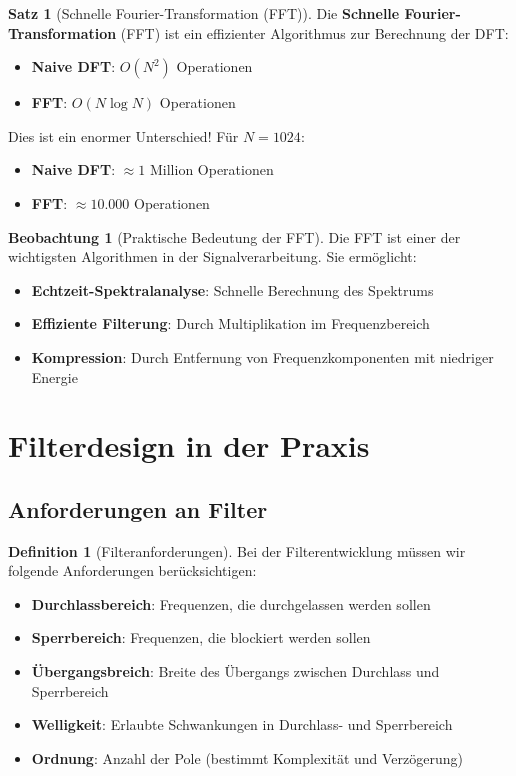 ﻿\documentclass[a4paper,12pt]{report}
\theoremstyle{definition}
\newtheorem{definition}{Definition}
\newtheorem{satz}{Satz}
\newtheorem{beobachtung}{Beobachtung}
\begin{document}
	\begin{satz}[Schnelle Fourier-Transformation (FFT)]
		Die \textbf{Schnelle Fourier-Transfor\-mation} (FFT) ist ein effizienter Algorithmus zur Berechnung der DFT:
		\begin{itemize}
			\item[-] \textbf{Naive DFT}: $O(N^2)$ Operationen
			\item[-] \textbf{FFT}: $O(N \log N)$ Operationen
		\end{itemize}
		
		Dies ist ein enormer Unterschied! Für $N = 1024$:
		\begin{itemize}
			\item[-] \textbf{Naive DFT}: $\approx 1$ Million Operationen
			\item[-] \textbf{FFT}: $\approx 10.000$ Operationen
		\end{itemize}
	\end{satz}
	
	\begin{beobachtung}[Praktische Bedeutung der FFT]
		Die FFT ist einer der wichtigsten Algorithmen in der Signalverarbeitung. Sie ermöglicht:
		\begin{itemize}
			\item[-] \textbf{Echtzeit-Spektralanalyse}: Schnelle Berechnung des Spektrums
			\item[-] \textbf{Effiziente Filterung}: Durch Multiplikation im Frequenzbereich
			\item[-] \textbf{Kompression}: Durch Entfernung von Frequenzkomponenten mit niedriger Energie
		\end{itemize}
	\end{beobachtung}
	
	\section{Filterdesign in der Praxis}
	
	\subsection{Anforderungen an Filter}
	
	\begin{definition}[Filteranforderungen]
		Bei der Filterentwicklung müssen wir folgende Anforderungen berücksichtigen:
		\begin{itemize}
			\item[-] \textbf{Durchlassbereich}: Frequenzen, die durchgelassen werden sollen
			\item[-] \textbf{Sperrbereich}: Frequenzen, die blockiert werden sollen
			\item[-] \textbf{Übergangsbreich}: Breite des Übergangs zwischen Durchlass und Sperrbereich
			\item[-] \textbf{Welligkeit}: Erlaubte Schwankungen in Durchlass- und Sperrbereich
			\item[-] \textbf{Ordnung}: Anzahl der Pole (bestimmt Komplexität und Verzögerung)
		\end{itemize}
	\end{definition}
	
\end{document}
